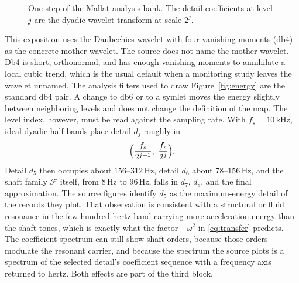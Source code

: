 \begin{figure}[H]
\centering
{}
\caption{One step of the Mallat analysis bank. The detail coefficients at level \(j\) are the dyadic wavelet transform at scale \(2^{j}\).}
\label{fig:mallat}
\end{figure}

This exposition uses the Daubechies wavelet with four vanishing moments (db4) as the concrete mother wavelet.
The source does not name the mother wavelet.
Db4 is short, orthonormal, and has enough vanishing moments to annihilate a local cubic trend, which is the usual default when a monitoring study leaves the wavelet unnamed.
The analysis filters used to draw Figure~\ref{fig:energy} are the standard db4 pair.
A change to db6 or to a symlet moves the energy slightly between neighboring levels and does not change the definition of the map.
The level index, however, must be read against the sampling rate.
With \(f_{s}=10\,\mathrm{kHz}\), ideal dyadic half-bands place detail \(d_{j}\) roughly in
\begin{equation}
\Bigl(\frac{f_{s}}{2^{j+1}},\ \frac{f_{s}}{2^{j}}\Bigr).
\label{eq:bands}
\end{equation}
Detail \(d_{5}\) then occupies about \(156\)--\(312\,\mathrm{Hz}\), detail \(d_{6}\) about \(78\)--\(156\,\mathrm{Hz}\), and the shaft family \(\mathcal{F}\) itself, from \(8\,\mathrm{Hz}\) to \(96\,\mathrm{Hz}\), falls in \(d_{7}\), \(d_{8}\), and the final approximation.
The source figures identify \(d_{5}\) as the maximum-energy detail of the records they plot.
That observation is consistent with a structural or fluid resonance in the few-hundred-hertz band carrying more acceleration energy than the shaft tones, which is exactly what the factor \(-\omega^{2}\) in \eqref{eq:transfer} predicts.
The coefficient spectrum can still show shaft orders, because those orders modulate the resonant carrier, and because the spectrum the source plots is a spectrum of the selected detail's coefficient sequence with a frequency axis returned to hertz.
Both effects are part of the third block.

